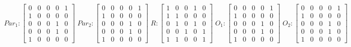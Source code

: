      $$
        Par_{1} : \begin{bmatrix}
            0 & 0 & 0 & 0 & 1 \\
            1 & 0 & 0 & 0 & 0 \\
            0 & 0 & 0 & 1 & 0 \\
			0 & 0 & 0 & 1 & 0 \\
            1 & 0 & 0 & 0 & 0 
        \end{bmatrix}
        \;
        Par_{2} : \begin{bmatrix}
            0 & 0 & 0 & 0 & 1 \\
            1 & 0 & 0 & 0 & 0 \\
            0 & 0 & 0 & 1 & 0 \\
            0 & 0 & 0 & 1 & 0 \\
            1 & 0 & 0 & 0 & 0
        \end{bmatrix}
        \;
        R : \begin{bmatrix}
            1 & 0 & 0 & 1 & 0 \\
            1 & 1 & 0 & 0 & 0 \\
            0 & 1 & 0 & 1 & 0 \\
            0 & 0 & 1 & 0 & 1 \\
            1 & 1 & 0 & 0 & 1
        \end{bmatrix}
        \;
        O_{1} : \begin{bmatrix}
            0 & 0 & 0 & 0 & 1 \\
            1 & 0 & 0 & 0 & 0 \\
            0 & 0 & 0 & 1 & 0 \\
            0 & 0 & 0 & 1 & 0 \\
            1 & 0 & 0 & 0 & 0
        \end{bmatrix}
        \;
        O_{2} : \begin{bmatrix}
            0 & 0 & 0 & 0 & 1 \\
            1 & 0 & 0 & 0 & 0 \\
            0 & 0 & 0 & 1 & 0 \\
            0 & 0 & 0 & 1 & 0 \\
            1 & 0 & 0 & 0 & 0
        \end{bmatrix}
    $$ 
